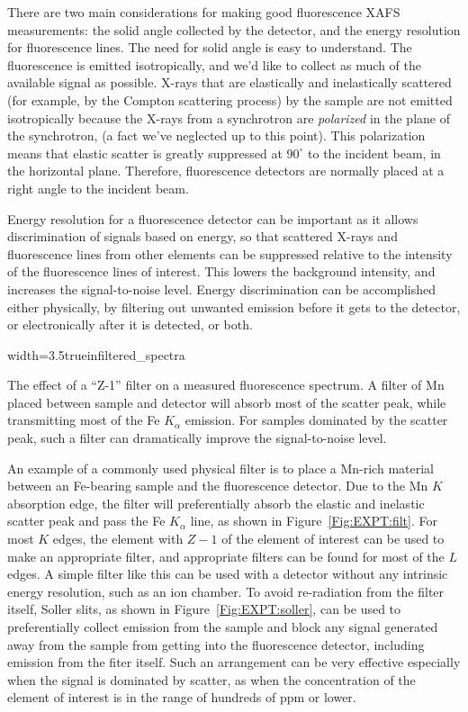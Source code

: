There are two main considerations for making good fluorescence XAFS
measurements: the solid angle collected by the detector, and the energy
resolution for fluorescence lines. The need for solid angle is easy to
understand.  The fluorescence is emitted isotropically, and we'd like to
collect as much of the available signal as possible.  X-rays that are
elastically and inelastically scattered (for example, by the Compton
scattering process) by the sample are not emitted isotropically because the
X-rays from a synchrotron are \emph{polarized} in the plane of the
synchrotron, (a fact we've neglected up to this point).  This polarization
means that elastic scatter is greatly suppressed at $90^{\circ}$ to the
incident beam, in the horizontal plane.  Therefore, fluorescence detectors
are normally placed at a right angle to the incident beam.

Energy resolution for a fluorescence detector can be important as it allows
discrimination of signals based on energy, so that scattered X-rays and
fluorescence lines from other elements can be suppressed relative to the
intensity of the fluorescence lines of interest.  This lowers the
background intensity, and increases the signal-to-noise level.  Energy
discrimination can be accomplished either physically, by filtering out
unwanted emission before it gets to the detector, or electronically after
it is detected, or both.

\begin{Nfig}{width=3.5truein}{filtered_spectra}
  \caption{The effect of a ``Z-1'' filter on a measured fluorescence
    spectrum.  A filter of Mn placed between sample and detector will absorb
    most of the scatter peak, while transmitting most of the Fe
    $K_{\alpha}$ emission. For samples dominated by the scatter peak, such
    a filter can dramatically improve the signal-to-noise level.}
  \label{Fig:EXPT:filt}
\end{Nfig}

An example of a commonly used physical filter is to place a Mn-rich
material between an Fe-bearing sample and the fluorescence detector.  Due
to the Mn $K$ absorption edge, the filter will preferentially absorb the
elastic and inelastic scatter peak and pass the Fe $K_{\alpha }$ line, as
shown in Figure~\ref{Fig:EXPT:filt}. For most $K$ edges, the element with
$Z-1$ of the element of interest can be used to make an appropriate filter,
and appropriate filters can be found for most of the $L$ edges.  A simple
filter like this can be used with a detector without any intrinsic energy
resolution, such as an ion chamber. To avoid re-radiation from the filter
itself, Soller slits, as shown in Figure~\ref{Fig:EXPT:soller}, can be used
to preferentially collect emission from the sample and block any signal
generated away from the sample from getting into the fluorescence detector,
including emission from the fiter itself.  Such an arrangement can be very
effective especially when the signal is dominated by scatter, as when the
concentration of the element of interest is in the range of hundreds of ppm
or lower.

